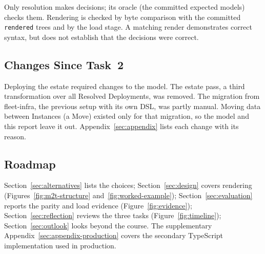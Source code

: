 Only resolution makes decisions; its oracle (the committed expected
models) checks them. Rendering is checked by byte comparison with the committed
\texttt{rendered} trees and by the load stage. A matching render demonstrates
correct syntax, but does not establish that the decisions were correct.

\subsection{Changes Since Task~2}
\label{sec:since-task2}

Deploying the estate required changes to the model. The estate pass, a third transformation over all Resolved
Deployments, was removed. The migration from fleet-infra, the previous setup with its
own DSL, was partly manual. Moving data between Instances (a Move) existed only for
that migration, so the model and this report leave it out.
Appendix~\ref{sec:appendix} lists each change with its reason.

\subsection{Roadmap}
\label{sec:roadmap}

Section~\ref{sec:alternatives} lists the choices; Section~\ref{sec:design}
covers rendering (Figures~\ref{fig:m2t-structure} and~\ref{fig:worked-example});
Section~\ref{sec:evaluation} reports the parity and load evidence
(Figure~\ref{fig:evidence}); Section~\ref{sec:reflection} reviews the three
tasks (Figure~\ref{fig:timeline}); Section~\ref{sec:outlook} looks beyond the
course. The supplementary Appendix~\ref{sec:appendix-production} covers the secondary TypeScript implementation used in production.
